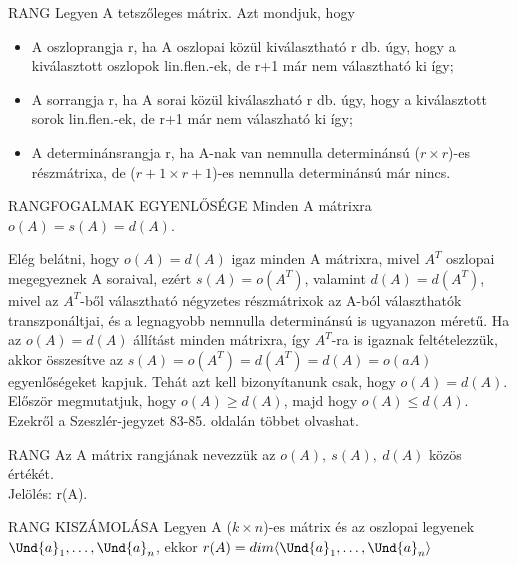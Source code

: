 \begin{definicio}{RANG}
Legyen A tetszőleges mátrix. Azt mondjuk, hogy
\begin{itemize}
\item A oszloprangja r, ha A oszlopai közül kiválasztható r db. úgy, hogy a kiválasztott oszlopok lin.flen.-ek, de r+1 már nem választható ki így;
\item A sorrangja r, ha A sorai közül kiválaszható r db. úgy, hogy a kiválasztott sorok lin.flen.-ek, de r+1 már nem válaszható ki így;
\item A determinánsrangja r, ha A-nak van nemnulla determinánsú ($r \times r$)-es részmátrixa, de ($r+1 \times r+1$)-es nemnulla determinánsú már nincs.
\end{itemize}
\end{definicio}

\begin{tetel}{RANGFOGALMAK EGYENLŐSÉGE}
Minden A mátrixra $o(A) = s(A) = d(A)$.
\end{tetel}

\begin{bizonyitas}{}
Elég belátni, hogy $o(A) = d(A)$ igaz minden A mátrixra, mivel $A^T$ oszlopai megegyeznek A soraival, ezért $s(A) = o(A^T)$, valamint $d(A) = d(A^T)$, mivel az $A^T$-ből választható négyzetes részmátrixok az A-ból választhatók transzponáltjai, és a legnagyobb nemnulla determinánsú is ugyanazon méretű. Ha az $o(A) = d(A)$ állítást minden mátrixra, így $A^T$-ra is igaznak feltételezzük, akkor összesítve az $s(A) = o(A^T) = d(A^T) = d(A) = o(aA)$ egyenlőségeket kapjuk. Tehát azt kell bizonyítanunk csak, hogy $o(A) = d(A)$. Először megmutatjuk, hogy $o(A) \geq d(A)$, majd hogy $o(A) \leq d(A)$. Ezekről a Szeszlér-jegyzet 83-85. oldalán többet olvashat.
\end{bizonyitas}

\begin{definicio}{RANG}
Az A mátrix rangjának nevezzük az $o(A),\: s(A),\: d(A)$ közös értékét.\\
Jelölés: r(A).
\end{definicio}

\begin{tetel}{RANG KISZÁMOLÁSA}
Legyen A ($k \times n$)-es mátrix és az oszlopai legyenek $\Und{a}_1, \ldots, \Und{a}_n$, ekkor $r(A) = dim\langle\Und{a}_1, \ldots, \Und{a}_n\rangle$
\end{tetel}

